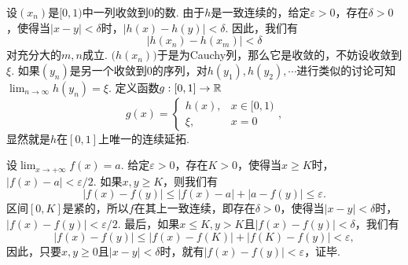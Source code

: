 \begin{ans}
  设$(x_n)$是$[0,1)$中一列收敛到$0$的数. 由于$h$是一致连续的，给定$\varepsilon>0$，存在$\delta>0$，使得当$|x-y|<\delta$时，$|h(x)-h(y)|<\delta$. 因此，我们有
  \[ |h(x_n)-h(x_m)| < \delta \]
  对充分大的$m,n$成立. $\big(h(x_n)\big)$于是为Cauchy列，那么它是收敛的，不妨设收敛到$\xi$. 如果$(y_n)$是另一个收敛到0的序列，对$h(y_1),h(y_2),\cdots$进行类似的讨论可知$\lim_{n\to\infty}h(y_n)=\xi$. 定义函数$g:[0,1]\to\mathbb R$
  \[ g(x)=\begin{cases}
    h(x), & x\in[0,1)\\
    \xi , & x=0
  \end{cases}, \]
  显然就是$h$在$[0,1]$上唯一的连续延拓.
\end{ans}

\begin{ans}
  设$\lim_{x\to+\infty}f(x)=a$. 给定$\varepsilon>0$，存在$K>0$，使得当$x\ge K$时，$|f(x)-a|<\varepsilon/2$. 如果$x,y\ge K$，则我们有
  \[ |f(x)-f(y)|\le |f(x)-a|+|a-f(y)|\le\varepsilon. \]
  区间$[0,K]$是紧的，所以$f$在其上一致连续，即存在$\delta>0$，使得当$|x-y|<\delta$时，$|f(x)-f(y)|<\varepsilon/2$. 最后，如果$x\le K,y>K$且$|f(x)-f(y)|<\delta$，我们有
  \[ |f(x)-f(y)|\le|f(x)-f(K)|+|f(K)-f(y)|<\varepsilon, \]
  因此，只要$x,y\ge0$且$|x-y|<\delta$时，就有$|f(x)-f(y)|<\varepsilon$，证毕.
\end{ans}

